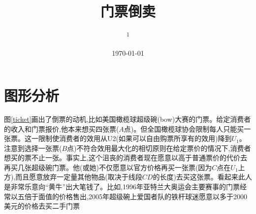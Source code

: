 \documentclass[10pt, a4paper]{ctexart} %
\title{门票倒卖} %
\author{
	\authorstyle{鲁晓东\textsuperscript{1}} %
	\newline\newline %
	\textsuperscript{1}\institution{中山大学岭南学院经济学系}\\ %
}
\date{\today} %
\begin{document}
\maketitle %

\thispagestyle{firstpage} %


	
	







\section*{图形分析}



图\ref{ticket}画出了倒票的动机,比如美国橄榄球超级碗(bow)大赛的门票。给定消费者的收入和门票报价,他本来想买四张票($A$点)。但全国橄榄球协会限制每人只能买一张票。这一限制使消费者的效用从U2(如果可以自由购票所享有的效用)降到$U_1$。注意到选择一张票($B$点)不符合效用最大化的相切原则在给定票价的情况下,消费者想买的票不止一张。事实上,这个沮丧的消费者现在愿意以高于普通票价的代价去再买几张超级碗门票。他(或她)不仅愿意以官方价格再买一张票(因为$C$点在$U_1$上方),而且愿意放弃一定量其他物品(取决于线段$CD$的长度)去买这张票。看起来此人是非常乐意向“黄牛”出大笔钱了。比如,1996年亚特兰大奥运会主要赛事的门票经常以五倍于面值的价格售出,2005年超级碗上爱国者队的铁杆球迷愿意以多于2000美元的价格去买二手门票
\end{document}
